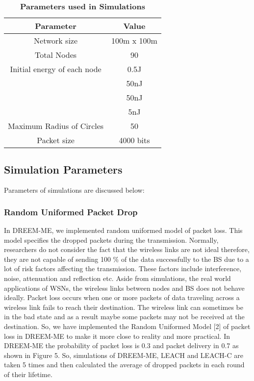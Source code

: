 \documentclass[journal]{IEEEtran}
\begin{document}
\begin{table}[ht]
\caption{\bf Parameters used in Simulations} \centering \begin{tabular}{|c| c|} \hline
Parameter & Value \\ [0.5ex] \hline Network size & 100m x 100m \\ Total Nodes & 90 \\
Initial energy of each node & 0.5J \\
 & 50nJ \\
 & 50nJ \\
 & 5nJ \\
Maximum Radius of Circles & 50 \\
Packet size & 4000 bits \\ [1ex] \hline \end{tabular}
\end{table}

\subsection{ Simulation Parameters }

Parameters of simulations are discussed below:

\subsubsection{ Random Uniformed Packet Drop }
In DREEM-ME, we implemented random uniformed model of packet loss. This model specifies the dropped packets during the transmission. Normally, researchers do not consider the fact that the wireless links are not ideal therefore, they are not capable of sending 100 \% of the data successfully to the BS due to a lot of risk factors affecting the transmission. These factors include interference, noise, attenuation and reflection etc. Aside from simulations, the real world applications of WSNs, the wireless links between nodes and BS does not behave ideally. Packet loss occurs when one or more packets of data traveling across a wireless link fails to reach their destination. The wireless link can sometimes be in the bad state and as a result maybe some packets may not be received at the destination. So, we have implemented the Random Uniformed Model [2] of packet loss in DREEM-ME to make it more close to reality and more practical. In DREEM-ME the probability of packet loss is 0.3 and packet delivery in 0.7 as shown in Figure 5. So, simulations of DREEM-ME, LEACH and LEACH-C are taken 5 times and then calculated the average of dropped packets in each round of their lifetime.
\end{document}
